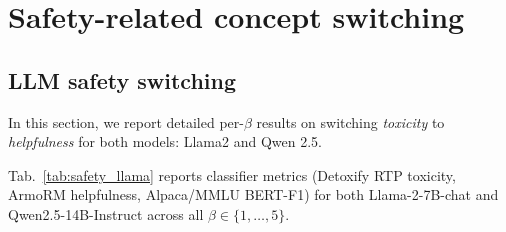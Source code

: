 \section{Safety-related concept switching}
\label{sec:safety_switching_suppl}

\subsection{LLM safety switching}
\label{sec:safety_switching_suppl_llm}

In this section, we report detailed per-$\beta$ results on switching \emph{toxicity} to \emph{helpfulness} for both models: Llama2 and Qwen 2.5.



Tab.~\ref{tab:safety_llama} reports classifier metrics (Detoxify RTP toxicity, ArmoRM helpfulness, Alpaca/MMLU BERT-F1) for both Llama-2-7B-chat and Qwen2.5-14B-Instruct across all $\beta\in\{1,\dots,5\}$. 



